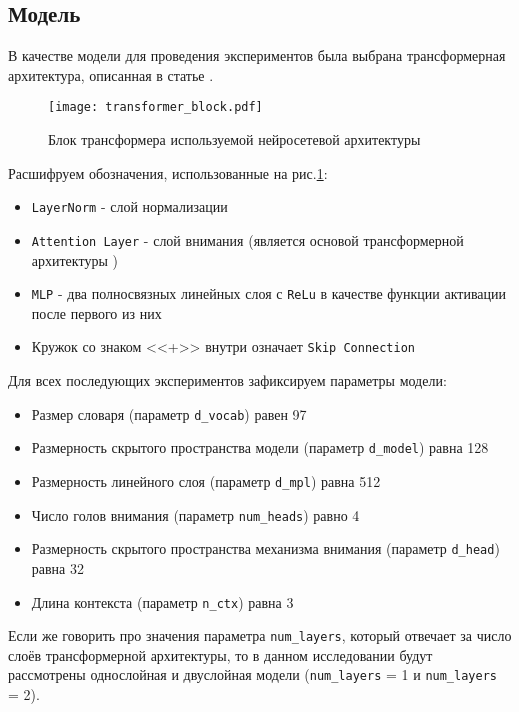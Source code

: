 \documentclass{article}
\begin{document}
\subsection{Модель}
В качестве модели для проведения экспериментов была выбрана трансформерная архитектура, описанная в статье \cite{omnigrok}.
\begin{figure}[h]
\centering
\texttt{[image: transformer\_block.pdf]}
\caption{Блок трансформера используемой нейросетевой архитектуры}
\label{fig:fig5}
\end{figure}
\par Расшифруем обозначения, использованные на рис.\ref{fig:fig5}:
\begin{itemize}
    \item \verb|LayerNorm| - слой нормализации
    \item \verb|Attention Layer| - слой внимания (является основой трансформерной архитектуры \cite{attn_is_all})
    \item \verb|MLP| - два полносвязных линейных слоя с \verb|ReLu|  в качестве функции активации после первого из них
    \item Кружок со знаком <<+>> внутри означает \verb|Skip Connection|
\end{itemize}
Для всех последующих экспериментов зафиксируем параметры модели:
\begin{itemize}
    \item Размер словаря (параметр \verb|d_vocab|) равен 97
    \item Размерность скрытого пространства модели (параметр \verb|d_model|) равна 128
    \item Размерность линейного слоя (параметр \verb|d_mpl|) равна 512
    \item Число голов внимания (параметр \verb|num_heads|) равно 4
    \item Размерность скрытого пространства механизма внимания (параметр \verb|d_head|) равна 32
    \item Длина контекста (параметр \verb|n_ctx|) равна 3
\end{itemize}
Если же говорить про значения параметра \verb|num_layers|, который отвечает за число слоёв трансформерной архитектуры, то в данном исследовании будут рассмотрены однослойная и двуслойная модели (\verb|num_layers| = 1 и \verb|num_layers| = 2).
\end{document}

